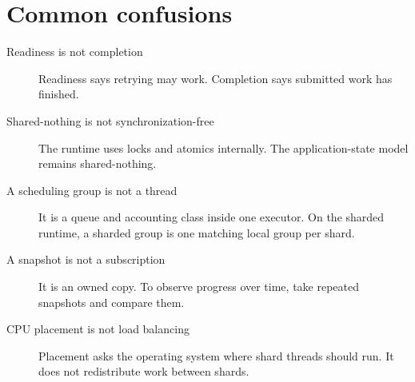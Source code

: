 \section{Common confusions}

\begin{description}
    \item[Readiness is not completion] Readiness says retrying may work.
        Completion says submitted work has finished.

    \item[Shared-nothing is not synchronization-free] The runtime uses locks
        and atomics internally. The application-state model remains
        shared-nothing.

    \item[A scheduling group is not a thread] It is a queue and accounting
        class inside one executor. On the sharded runtime, a sharded group is
        one matching local group per shard.

    \item[A snapshot is not a subscription] It is an owned copy. To observe
        progress over time, take repeated snapshots and compare them.

    \item[CPU placement is not load balancing] Placement asks the operating
        system where shard threads should run. It does not redistribute work
        between shards.
\end{description}
